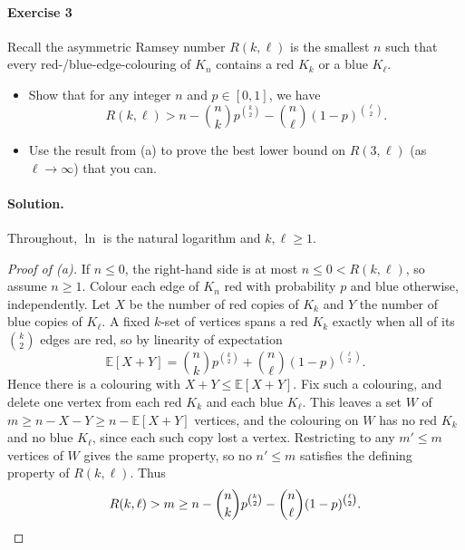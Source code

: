 \documentclass[a4paper,12pt]{article}
\newcommand{\mb}[1]{\mathbb{#1}}
\begin{document}
\paragraph{Exercise 3}  Recall the asymmetric Ramsey number $R(k, \ell)$ is the smallest $n$ such that every red-/blue-edge-colouring of $K_n$ contains a red $K_k$ or a blue $K_{\ell}$.
\begin{itemize}
	\item[(a)] Show that for any integer $n$ and $p \in [0,1]$, we have
\[ R(k, \ell) > n - \binom{n}{k} p^{\binom{k}{2}} - \binom{n}{\ell} (1 - p)^{\binom{\ell}{2}}. \]
	\item[(b)] Use the result from (a) to prove the best lower bound on $R(3, \ell)$ (as $\ell \to \infty$) that you can.
\end{itemize}

\paragraph{Solution.} Throughout, $\ln$ is the natural logarithm and $k, \ell \ge 1$.

\begin{proof}[Proof of (a)]
	If $n \le 0$, the right-hand side is at most $n \le 0 < R(k, \ell)$, so assume $n \ge 1$. Colour each edge of $K_n$ red with probability $p$ and blue otherwise, independently. Let $X$ be the number of red copies of $K_k$ and $Y$ the number of blue copies of $K_\ell$. A fixed $k$-set of vertices spans a red $K_k$ exactly when all of its $\binom k2$ edges are red, so by linearity of expectation
	\[
		\mb E[X + Y] = \binom nk p^{\binom k2} + \binom n\ell (1-p)^{\binom \ell2}.
	\]
	Hence there is a colouring with $X + Y \le \mb E[X+Y]$. Fix such a colouring, and delete one vertex from each red $K_k$ and each blue $K_\ell$. This leaves a set $W$ of $m \ge n - X - Y \ge n - \mb E[X + Y]$ vertices, and the colouring on $W$ has no red $K_k$ and no blue $K_\ell$, since each such copy lost a vertex. Restricting to any $m' \le m$ vertices of $W$ gives the same property, so no $n' \le m$ satisfies the defining property of $R(k, \ell)$. Thus
	\[
		R(k, \ell) > m \ge n - \binom nk p^{\binom k2} - \binom n\ell (1-p)^{\binom \ell2}. \qedhere
	\]
\end{proof}
\end{document}
